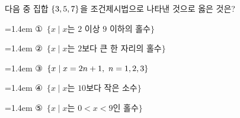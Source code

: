 다음 중 집합 $\{3{,}\mkern3mu\mathopen{}5{,}\mkern3mu\mathopen{}7\}$을 조건제시법으로 나타낸 것으로 옳은 것은?
\par\medskip\par\noindent\hangindent=1.4em {\small ①}\ $\{x \mid x$는 $2$ 이상 $9$ 이하의 홀수$\}$\par\noindent\hangindent=1.4em {\small ②}\ $\{x \mid x$는 $2$보다 큰 한 자리의 홀수$\}$\par\noindent\hangindent=1.4em {\small ③}\ $\{x \mid x=2n+1,\ n=1{,}\mkern3mu\mathopen{}2{,}\mkern3mu\mathopen{}3\}$\par\noindent\hangindent=1.4em {\small ④}\ $\{x \mid x$는 $10$보다 작은 소수$\}$\par\noindent\hangindent=1.4em {\small ⑤}\ $\{x \mid x$는 $0<x<9$인 홀수$\}$\par\medskip
